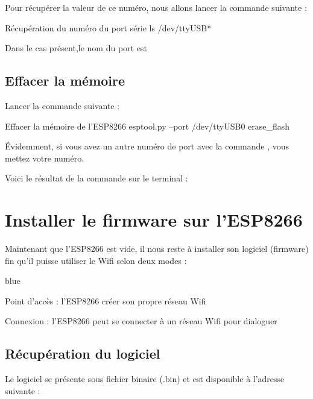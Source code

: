 Pour récupérer la valeur de ce numéro, nous allons lancer la commande suivante : 

\begin{Bash}{Récupération du numéro du port série}
ls /dev/ttyUSB*
\end{Bash}


Dans le cas présent,le nom du port est 

\subsection{Effacer la mémoire}

Lancer la commande suivante : 
\begin{Bash}{Effacer la mémoire de l'ESP8266}
esptool.py --port /dev/ttyUSB0 erase_flash
\end{Bash}

Évidemment, si vous avez un autre numéro de port avec la commande , vous mettez votre numéro.

Voici le résultat de la commande sur le terminal : 



\section{Installer le firmware sur l'ESP8266}

Maintenant que l'ESP8266 est vide, il nous reste à installer son logiciel (firmware) fin qu'il puisse utiliser le Wifi selon deux modes : 

\begin{items}{blue}{\Triangle}
    \item Point d'accès : l'ESP8266 créer son propre réseau Wifi
    \item Connexion : l'ESP8266 peut se connecter à un réseau Wifi pour dialoguer
\end{items}

\subsection{Récupération du logiciel}

Le logiciel se présente sous fichier binaire (.bin) et est disponible à l'adresse suivante : \\

